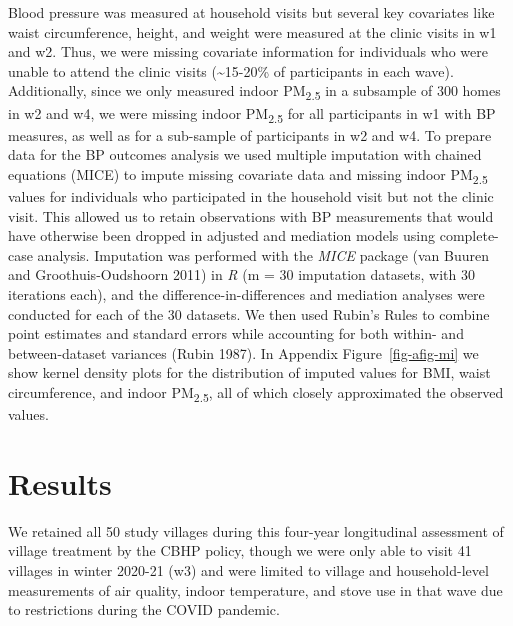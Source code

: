 \documentclass[
  letterpaper,
  DIV=11,
  numbers=noendperiod]{scrartcl}
\begin{document}
Blood pressure was measured at household visits but several key
covariates like waist circumference, height, and weight were measured at
the clinic visits in w1 and w2. Thus, we were missing covariate
information for individuals who were unable to attend the clinic visits
(\textasciitilde15-20\% of participants in each wave). Additionally,
since we only measured indoor PM\textsubscript{2.5} in a subsample of
300 homes in w2 and w4, we were missing indoor PM\textsubscript{2.5} for
all participants in w1 with BP measures, as well as for a sub-sample of
participants in w2 and w4. To prepare data for the BP outcomes analysis
we used multiple imputation with chained equations (MICE) to impute
missing covariate data and missing indoor PM\textsubscript{2.5} values
for individuals who participated in the household visit but not the
clinic visit. This allowed us to retain observations with BP
measurements that would have otherwise been dropped in adjusted and
mediation models using complete-case analysis. Imputation was performed
with the \emph{MICE} package (van Buuren and Groothuis-Oudshoorn 2011)
in \emph{R} (m = 30 imputation datasets, with 30 iterations each), and
the difference-in-differences and mediation analyses were conducted for
each of the 30 datasets. We then used Rubin's Rules to combine point
estimates and standard errors while accounting for both within- and
between-dataset variances (Rubin 1987). In Appendix
Figure~\ref{fig-afig-mi} we show kernel density plots for the
distribution of imputed values for BMI, waist circumference, and indoor
PM\textsubscript{2.5}, all of which closely approximated the observed
values.

\hypertarget{results-1}{%
\section{Results}\label{results-1}}

We retained all 50 study villages during this four-year longitudinal
assessment of village treatment by the CBHP policy, though we were only
able to visit 41 villages in winter 2020-21 (w3) and were limited to
village and household-level measurements of air quality, indoor
temperature, and stove use in that wave due to restrictions during the
COVID pandemic.
\end{document}
